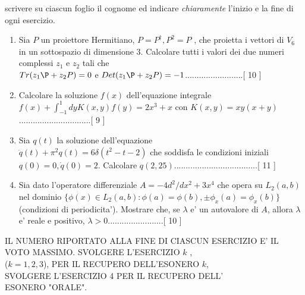 \documentclass[a4paper,10pt]{article}
\begin{document}
\noindent
scrivere su ciascun foglio il cognome ed indicare
\emph{chiaramente} l'inizio e la fine di ogni esercizio.
\vspace{20pt}
\noindent
\begin{enumerate}
\item  Sia $P$ un proiettore Hermitiano, $P=P^{\dagger}, P^2=P$ , che
proietta i vettori di $V_6$ in un sottospazio di dimensione $3$.
Calcolare tutti i valori dei due numeri complessi $z_1$ e $z_2$ tali che
\\$Tr(z_1\P +z_2P)=0$ e $Det(z_1\P +z_2P)=-1$.........................[ 10 ] 
\item  Calcolare la soluzione $f(x)$ dell'equazione
integrale\\$f(x)+\int_{-1}^1dyK(x,y)f(y)=2x^3+x$ con
$K(x,y)=xy(x+y)$...............................[ 9 ]
\item  Sia $q(t)$ la soluzione dell'equazione\\$\ddot{q}(t)+\pi^2q(t)
=6\delta(t^2-t-2)$ che soddisfa le condizioni iniziali
$q(0)=0,\dot{q}(0)=2$. Calcolare $q(2,25)$....................................[ 11 ]
\item  Sia dato l'operatore differenziale $A=-4d^2/dx^2+3x^4$ che opera
su $L_2(a,b)$ nel dominio $\{\phi(x)\in
L_2(a,b):\phi(a)=\phi(b),\pm\phi_x(a)=\phi_x(b)\}$ (condizioni di
periodicita'). Mostrare che, se $\lambda$ e' un autovalore di $A$,
allora $\lambda$ e' reale e positivo, $\lambda>0$........................[ 10 ]  

\end{enumerate}
\vspace{20pt}
\noindent IL NUMERO RIPORTATO ALLA FINE DI CIASCUN ESERCIZIO
E' IL VOTO MASSIMO. SVOLGERE L'ESERCIZIO $k$ ,\\($k=1,2,3$), PER IL
RECUPERO DELL'ESONERO $k$, \\SVOLGERE L'ESERCIZIO 4 PER IL RECUPERO
DELL'\\ESONERO "ORALE".
\end{document}
